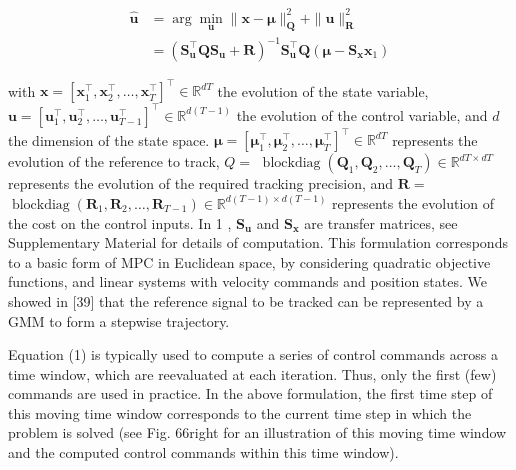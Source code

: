 \documentclass[10pt]{article}
\begin{document}
$$
\begin{aligned}
\hat{\boldsymbol{u}} & =\arg \min _{\boldsymbol{u}}\|\boldsymbol{x}-\boldsymbol{\mu}\|_{\boldsymbol{Q}}^{2}+\|\boldsymbol{u}\|_{\boldsymbol{R}}^{2} \\
& =\left(\boldsymbol{S}_{\boldsymbol{u}}^{\top} \boldsymbol{Q} \boldsymbol{S}_{\boldsymbol{u}}+\boldsymbol{R}\right)^{-1} \boldsymbol{S}_{\boldsymbol{u}}^{\top} \boldsymbol{Q}\left(\boldsymbol{\mu}-\boldsymbol{S}_{\boldsymbol{x}} \boldsymbol{x}_{1}\right)
\end{aligned}
$$

with $\boldsymbol{x}=\left[\boldsymbol{x}_{1}^{\top}, \boldsymbol{x}_{2}^{\top}, \ldots, \boldsymbol{x}_{T}^{\top}\right]^{\top} \in \mathbb{R}^{d T}$ the evolution of the state variable, $\boldsymbol{u}=\left[\boldsymbol{u}_{1}^{\top}, \boldsymbol{u}_{2}^{\top}, \ldots, \boldsymbol{u}_{T-1}^{\top}\right]^{\top} \in \mathbb{R}^{d(T-1)}$ the evolution of the control variable, and $d$ the dimension of the state space. $\boldsymbol{\mu}=\left[\boldsymbol{\mu}_{1}^{\top}, \boldsymbol{\mu}_{2}^{\top}, \ldots, \boldsymbol{\mu}_{T}^{\top}\right]^{\top} \in \mathbb{R}^{d T}$ represents the evolution of the reference to track, $Q=$ $\operatorname{blockdiag}\left(\boldsymbol{Q}_{1}, \boldsymbol{Q}_{2}, \ldots, \boldsymbol{Q}_{T}\right) \in \mathbb{R}^{d T \times d T}$ represents the evolution of the required tracking precision, and $\boldsymbol{R}=$ $\operatorname{blockdiag}\left(\boldsymbol{R}_{1}, \boldsymbol{R}_{2}, \ldots, \boldsymbol{R}_{T-1}\right) \in \mathbb{R}^{d(T-1) \times d(T-1)}$ represents the evolution of the cost on the control inputs. In 1 , $\boldsymbol{S}_{\boldsymbol{u}}$ and $\boldsymbol{S}_{\boldsymbol{x}}$ are transfer matrices, see Supplementary Material for details of computation. This formulation corresponds to a basic form of MPC in Euclidean space, by considering quadratic objective functions, and linear systems with velocity commands and position states. We showed in [39] that the reference signal to be tracked can be represented by a GMM to form a stepwise trajectory.

Equation (1) is typically used to compute a series of control commands across a time window, which are reevaluated at each iteration. Thus, only the first (few) commands are used in practice. In the above formulation, the first time step of this moving time window corresponds to the current time step in which the problem is solved (see Fig. 66right for an illustration of this moving time window and the computed control commands within this time window).
\end{document}
